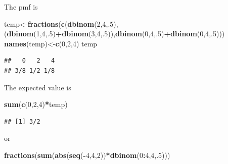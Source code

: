 \documentclass[]{book}
\newenvironment{Shaded}{\begin{snugshade}}{\end{snugshade}}
\newcommand{\KeywordTok}[1]{\textcolor[rgb]{0.13,0.29,0.53}{\textbf{#1}}}
\newcommand{\DecValTok}[1]{\textcolor[rgb]{0.00,0.00,0.81}{#1}}
\newcommand{\OperatorTok}[1]{\textcolor[rgb]{0.81,0.36,0.00}{\textbf{#1}}}
\newcommand{\NormalTok}[1]{#1}
\theoremstyle{definition}
\theoremstyle{definition}
\theoremstyle{definition}
\theoremstyle{remark}
\begin{document}
The pmf is

\begin{Shaded}
\begin{Highlighting}[]
\NormalTok{temp<-}\KeywordTok{fractions}\NormalTok{(}\KeywordTok{c}\NormalTok{(}\KeywordTok{dbinom}\NormalTok{(}\DecValTok{2}\NormalTok{,}\DecValTok{4}\NormalTok{,.}\DecValTok{5}\NormalTok{),(}\KeywordTok{dbinom}\NormalTok{(}\DecValTok{1}\NormalTok{,}\DecValTok{4}\NormalTok{,.}\DecValTok{5}\NormalTok{)}\OperatorTok{+}\KeywordTok{dbinom}\NormalTok{(}\DecValTok{3}\NormalTok{,}\DecValTok{4}\NormalTok{,.}\DecValTok{5}\NormalTok{)),}\KeywordTok{dbinom}\NormalTok{(}\DecValTok{0}\NormalTok{,}\DecValTok{4}\NormalTok{,.}\DecValTok{5}\NormalTok{)}\OperatorTok{+}\KeywordTok{dbinom}\NormalTok{(}\DecValTok{0}\NormalTok{,}\DecValTok{4}\NormalTok{,.}\DecValTok{5}\NormalTok{)))}
\KeywordTok{names}\NormalTok{(temp)<-}\KeywordTok{c}\NormalTok{(}\DecValTok{0}\NormalTok{,}\DecValTok{2}\NormalTok{,}\DecValTok{4}\NormalTok{)}
\NormalTok{temp}
\end{Highlighting}
\end{Shaded}

\begin{verbatim}
##   0   2   4 
## 3/8 1/2 1/8
\end{verbatim}

The expected value is

\begin{Shaded}
\begin{Highlighting}[]
\KeywordTok{sum}\NormalTok{(}\KeywordTok{c}\NormalTok{(}\DecValTok{0}\NormalTok{,}\DecValTok{2}\NormalTok{,}\DecValTok{4}\NormalTok{)}\OperatorTok{*}\NormalTok{temp)}
\end{Highlighting}
\end{Shaded}

\begin{verbatim}
## [1] 3/2
\end{verbatim}

or

\begin{Shaded}
\begin{Highlighting}[]
\KeywordTok{fractions}\NormalTok{(}\KeywordTok{sum}\NormalTok{(}\KeywordTok{abs}\NormalTok{(}\KeywordTok{seq}\NormalTok{(}\OperatorTok{-}\DecValTok{4}\NormalTok{,}\DecValTok{4}\NormalTok{,}\DecValTok{2}\NormalTok{))}\OperatorTok{*}\KeywordTok{dbinom}\NormalTok{(}\DecValTok{0}\OperatorTok{:}\DecValTok{4}\NormalTok{,}\DecValTok{4}\NormalTok{,.}\DecValTok{5}\NormalTok{)))}
\end{Highlighting}
\end{Shaded}
\end{document}
